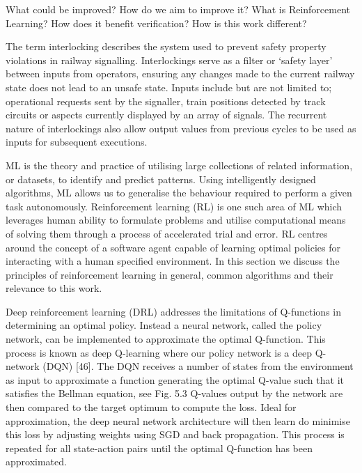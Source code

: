 \documentclass[runningheads]{llncs}
\begin{document}
What could be improved?
How do we aim to improve it?
What is Reinforcement Learning?
How does it benefit verification?
How is this work different?

 
The term interlocking describes the system used to prevent safety property violations in
railway signalling. Interlockings serve as a filter or ‘safety layer’ between inputs from operators, ensuring any changes made to the current railway state does not lead to an
unsafe state. Inputs include but are not limited to; operational requests sent by the signaller,
train positions detected by track circuits or aspects currently displayed by an array of
signals. The recurrent nature of interlockings also allow output values from previous
cycles to be used as inputs for subsequent executions.


ML is the theory and practice of utilising large collections of related information, or datasets, to identify and
predict patterns. Using intelligently designed algorithms, ML allows us to generalise the
behaviour required to perform a given task autonomously. 
Reinforcement learning (RL) is one such area of ML which leverages human ability to formulate problems and utilise computational means of solving them through a process of accelerated trial and error. RL centres around the concept of a software agent capable of learning optimal policies for interacting with a human specified environment. In this section we discuss the principles of reinforcement learning in general, common
algorithms and their relevance to this work. 

Deep reinforcement learning (DRL) addresses the limitations of Q-functions in determining an optimal policy. Instead a neural network, called the policy network, can be implemented to approximate the optimal Q-function. This process is known as deep Q-learning where our policy network is a deep Q-network (DQN) [46]. The DQN receives a number of states from the environment as input to approximate a function generating the optimal Q-value such that it satisfies the Bellman equation, see Fig. 5.3 Q-values output by the network are then compared to the target optimum to compute the loss. Ideal for approximation, the deep neural network architecture will then learn do minimise this loss by adjusting weights using SGD and back propagation. This process is repeated for all state-action pairs until the optimal Q-function has been approximated. 
\end{document}
